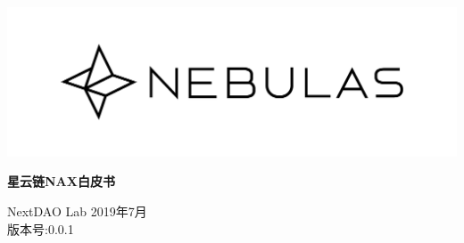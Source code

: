 \documentclass[12pt]{article}
\begin{document}
\pagestyle{empty}
\renewcommand{\contentsname}{目录}
\renewcommand{\abstractname}{摘要}
\renewcommand{\refname}{参考文献}
\renewcommand{\figurename}{图}
\renewcommand{\tablename}{表}
\renewcommand{\baselinestretch}{1.5}
\renewcommand{\appendixname}{附录}
\renewcommand{\proofname}{证明}


\begin{titlepage}
  \begin{center}
    \vspace*{5.5cm}
    \includegraphics[scale=0.4]{../common/Nebulas.png}
    \vspace{0.5cm}


    \textbf{\huge{星云链NAX白皮书}}

    \vspace{0.5cm}
    NextDAO Lab
    \vfill
    2019年7月 \\
    版本号:0.0.1
    \textbf{}
  \end{center}

\end{titlepage}
\setcounter{page}{0}
\tableofcontents
\newpage
\setcounter{page}{1}
\pagestyle{fancy}
\vspace*{0.01cm}





\newpage


\newpage 
\begin{appendices}

%

\end{appendices}
\end{document}
